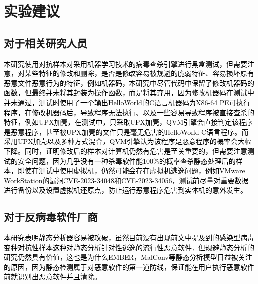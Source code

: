\section{实验建议}

\subsection{对于相关研究人员}

\textcolor{black}{本研究使用对抗样本对采用机器学习技术的病毒查杀引擎进行黑盒测试，但需要注意，对某些特征的修改和删除，是否是修改容易被规避的脆弱特征、容易损坏原有恶意文件恶意行为的特征，例如机器码，本研究中尽管代码中保留了修改机器码的函数，但最终并未将其封装为操作函数，而是将其弃用，因为修改机器码在测试中并未通过，测试时使用了一个输出HelloWorld的C语言机器码为X86-64 PE可执行程序，在修改机器码后，导致程序无法执行、以及一些容易导致程序被直接查杀的特征，例如UPX加壳，在测试中，只采取UPX加壳，QVM引擎会直接判定该程序是恶意程序，甚至被UPX加壳的文件只是毫无危害的HelloWorld C语言程序。而采用UPX加壳以及多种方式混合，QVM引擎认为该程序是恶意程序的概率会大幅下降。同时，证明修改后的样本对计算机仍然有危害是至关重要的，但需要注意测试的安全问题，因为几乎没有一种杀毒软件能100\%的概率查杀静态处理后的样本，即使在测试中使用虚拟机，仍然可能会存在虚拟机逃逸问题，例如VMware WorkStation的漏洞CVE-2023-34048和CVE-2023-34056，测试前尽量对重要数据进行备份以及设置虚拟机还原点，防止运行恶意程序危害到实体机的意外发生。}

\subsection{对于反病毒软件厂商}

\textcolor{black}{本研究表明静态分析器容易被攻破，虽然目前没有出现前文中提及到的感染型病毒变种对抗性样本这种对静态分析针对性逃逸的流行性恶意软件，但规避静态分析的研究仍然具有价值，这也是为什么EMBER，MalConv等静态分析模型日益被关注的原因\cite{ref15}，因为静态检测属于对恶意软件的第一道防线，保证能在用户执行恶意软件前就识别出恶意软件并且清除。}

